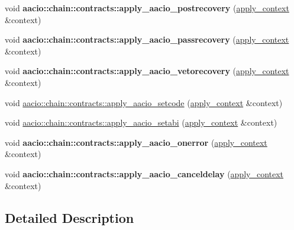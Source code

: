 \begin{DoxyCompactItemize}
void {\bfseries aacio\+::chain\+::contracts\+::apply\+\_\+aacio\+\_\+postrecovery} (\mbox{\hyperlink{classaacio_1_1chain_1_1apply__context}{apply\+\_\+context}} \&context)
\item 
\mbox{\label{group__native__action__handlers_gaad66abe916df42f91f99dd7490367629}} 
void {\bfseries aacio\+::chain\+::contracts\+::apply\+\_\+aacio\+\_\+passrecovery} (\mbox{\hyperlink{classaacio_1_1chain_1_1apply__context}{apply\+\_\+context}} \&context)
\item 
\mbox{\label{group__native__action__handlers_ga40dfcb098b38d37c4638e36b31bf4e87}} 
void {\bfseries aacio\+::chain\+::contracts\+::apply\+\_\+aacio\+\_\+vetorecovery} (\mbox{\hyperlink{classaacio_1_1chain_1_1apply__context}{apply\+\_\+context}} \&context)
\item 
void \mbox{\hyperlink{group__native__action__handlers_ga347ed41f4279b42111b3864eb74955d5}{aacio\+::chain\+::contracts\+::apply\+\_\+aacio\+\_\+setcode}} (\mbox{\hyperlink{classaacio_1_1chain_1_1apply__context}{apply\+\_\+context}} \&context)
\item 
void \mbox{\hyperlink{group__native__action__handlers_ga2ad87dd9ef3cc42d8e4a0a8b86d60901}{aacio\+::chain\+::contracts\+::apply\+\_\+aacio\+\_\+setabi}} (\mbox{\hyperlink{classaacio_1_1chain_1_1apply__context}{apply\+\_\+context}} \&context)
\item 
\mbox{\label{group__native__action__handlers_ga2d378520b1c57c0cfaf3fdd7efed9a71}} 
void {\bfseries aacio\+::chain\+::contracts\+::apply\+\_\+aacio\+\_\+onerror} (\mbox{\hyperlink{classaacio_1_1chain_1_1apply__context}{apply\+\_\+context}} \&context)
\item 
\mbox{\label{group__native__action__handlers_ga69c1ff4276c6df18b5fb6a542802c6c3}} 
void {\bfseries aacio\+::chain\+::contracts\+::apply\+\_\+aacio\+\_\+canceldelay} (\mbox{\hyperlink{classaacio_1_1chain_1_1apply__context}{apply\+\_\+context}} \&context)
\end{DoxyCompactItemize}


\subsection{Detailed Description}


